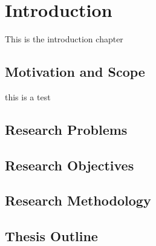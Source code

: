 \chapter{Introduction}

    This is the introduction chapter

    \section{Motivation and Scope}

    this is a test \cite{datacloudAbout}
    \section{Research Problems}
    \section{Research Objectives}
    \section{Research Methodology}
    \section{Thesis Outline}


